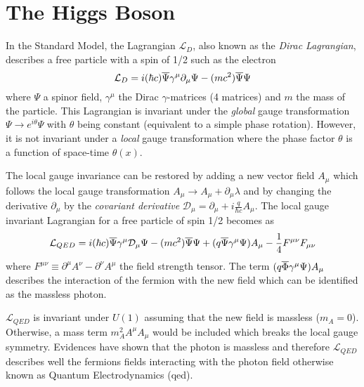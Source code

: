 \section{The Higgs Boson}
\label{sec:HiggsTheo}

In the Standard Model, the Lagrangian $\mathcal{L}_{D}$, also known as the \textit{Dirac Lagrangian}, describes a free particle with a spin of 1/2 such as the electron \cite{Griffiths:343277}
\begin{equation}
  \mathcal{L}_{D} = i(\hbar c)\overline{\rm \Psi}\gamma^{\mu}\partial_{\mu}\Psi - (mc^2)\overline{\rm \Psi}\Psi
\end{equation}
where $\Psi$ a spinor field, $\gamma^{\mu}$ the Dirac $\gamma$-matrices (4 matrices) \cite{Peskin:1995ev} and $m$ the mass of the particle. This Lagrangian is invariant under the \textit{global} gauge transformation $\Psi \rightarrow e^{i\theta}\Psi$ with $\theta$ being constant (equivalent to a simple phase rotation). However, it is not invariant under a \textit{local} gauge transformation where the phase factor $\theta$ is a function of space-time $\theta(x)$.

The local gauge invariance can be restored by adding a new vector field $A_{\mu}$ which follows the local gauge transformation $A_{\mu} \rightarrow A_{\mu} + \partial_{\mu}\lambda$ and by changing the derivative $\partial_{\mu}$ by the \textit{covariant derivative} $\mathcal{D}_{\mu} = \partial_{\mu} + i\frac{q}{\hbar c}A_{\mu}$. The local gauge invariant Lagrangian for a free particle of spin 1/2 becomes as \cite{Griffiths:343277}
\begin{equation}
  \mathcal{L}_{QED} = i(\hbar c)\overline{\rm \Psi}\gamma^{\mu}\mathcal{D}_{\mu}\Psi - (mc^2)\overline{\rm \Psi}\Psi + (q\overline{\rm \Psi}\gamma^{\mu}\Psi)A_{\mu} - \frac{1}{4}F^{\mu\nu}F_{\mu\nu}
\end{equation}
where $F^{\mu\nu} \equiv \partial^{\mu}A^{\nu} - \partial^{\nu}A^{\mu}$ the field strength tensor. The term $(q\overline{\rm \Phi}\gamma^{\mu}\Psi)A_{\mu}$ describes the interaction of the fermion with the new field which can be identified as the massless photon.

$\mathcal{L}_{QED}$ is invariant under $U(1)$ assuming that the new field is massless ($m_{A} = 0$). Otherwise, a mass term $m_{A}^2A^{\mu}A_{\mu}$ would be included which breaks the local gauge symmetry. Evidences \cite{Lakes:1998mi, Chibisov:1976mm, Williams:1971ms} have shown that the photon is massless and therefore $\mathcal{L}_{QED}$ describes well the fermions fields interacting with the photon field otherwise known as Quantum Electrodynamics (\acrshort{qed}).

